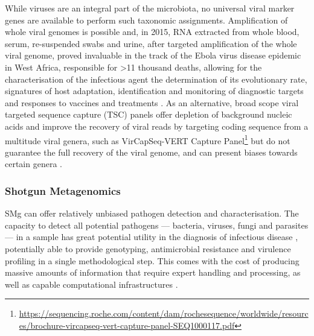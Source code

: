 While viruses are an integral part of the microbiota, no universal viral marker genes are available to perform such taxonomic assignments. 
Amplification of whole viral genomes is possible and, in 2015, \ac{RNA} extracted from whole blood, serum, re-suspended swabs and urine, after targeted amplification of the whole viral genome, proved invaluable in the track of the Ebola virus disease epidemic in West Africa, responsible for >11 thousand deaths, allowing for the characterisation of the infectious agent the determination of its evolutionary rate, signatures of host adaptation, identification and monitoring of diagnostic targets and responses to vaccines and treatments \citep{quick_real-time_2016}.
As an alternative, broad scope viral targeted sequence capture (TSC) panels offer depletion of background nucleic acids and improve the recovery of viral reads by targeting coding sequence from a multitude viral genera, such as VirCapSeq-VERT Capture Panel\footnote{\url{https://sequencing.roche.com/content/dam/rochesequence/worldwide/resources/brochure-vircapseq-vert-capture-panel-SEQ1000117.pdf}} but do not guarantee the full recovery of the viral genome, and can present biases towards certain genera \citep{schuele_assessment_2020, wylie_enhanced_2015}. 

\subsubsection{Shotgun Metagenomics} \label{sssec:_intro_shotgun_metagenomics}

\ac{SMg} can offer relatively unbiased pathogen detection and characterisation. The capacity to detect all potential pathogens — bacteria, viruses, fungi and parasites — in a sample has great potential utility in the diagnosis of infectious disease \citep{chiu_clinical_2019}, potentially able to provide genotyping, antimicrobial resistance and virulence profiling in a single methodological step. This comes with the cost of producing massive amounts of information that require expert handling and processing, as well as capable computational infrastructures \citep{couto_critical_2018, rossen_practical_2018}.


